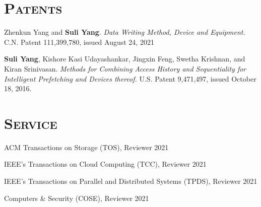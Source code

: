 \documentclass[10pt, letterpaper]{article}
\renewenvironment{itemize}{
  \begin{list}{}{
    \setlength{\leftmargin}{1.2em}
    \setlength{\itemsep}{0.12em}
    \setlength{\parskip}{0pt}
    \setlength{\parsep}{0.12em}
  }
}{
  \end{list}
}
\begin{document}
\section*{\textsc{Patents}}
\begin{enumerate}[fullwidth,itemindent=1.1em,label={[\arabic*]}]
    \item Zhenkun Yang and {\bf Suli Yang}. \textit{Data Writing Method, Device and Equipment.} C.N. Patent 111,399,780, issued August 24, 2021

     \item {\bf Suli Yang}, Kishore Kasi Udayashankar, Jingxin Feng, Swetha Krishnan, and Kiran Srinivasan. \textit{Methods for Combining Access History and Sequentiality for Intelligent Prefetching and Devices thereof.} U.S. Patent 9,471,497, issued October 18, 2016.

\end{enumerate}


\section*{\textsc{Service}}
\begin{itemize}
	\item ACM Transactions on Storage (TOS), Reviewer \hfill 2021
	\item IEEE's Transactions on Cloud Computing (TCC), Reviewer \hfill 2021
        \item IEEE's Transactions on Parallel and Distributed Systems (TPDS), Reviewer \hfill 2021
	\item Computers \& Security (COSE), Reviewer \hfill 2021
\end{itemize}
\end{document}
